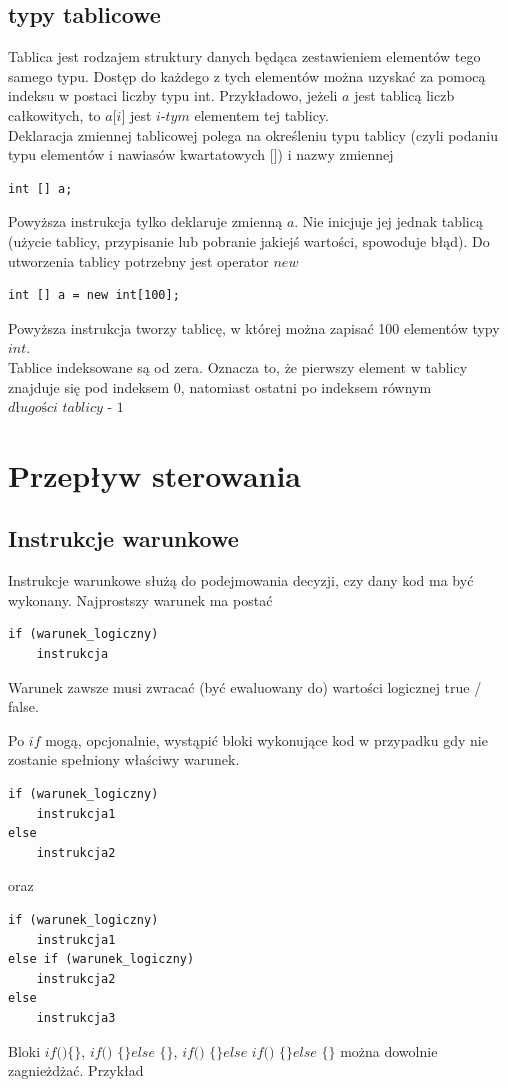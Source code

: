 \documentclass[11pt]{article}
\begin{document}
\subsection{typy tablicowe} 
Tablica jest rodzajem struktury danych będąca zestawieniem elementów tego samego typu. Dostęp do każdego z tych elementów można uzyskać za pomocą indeksu w postaci liczby typu int. Przykładowo, jeżeli $\textit{a}$ jest tablicą liczb całkowitych, to $\textit{a[i]}$ jest $\textit{i-tym}$ elementem tej tablicy.\\
Deklaracja zmiennej tablicowej polega na określeniu typu tablicy (czyli podaniu typu elementów i nawiasów kwartatowych $\textit{[]}$) i nazwy zmiennej
\begin{lstlisting}
int [] a;
\end{lstlisting}
Powyższa instrukcja tylko deklaruje zmienną $\textit{a}$. Nie inicjuje jej jednak tablicą (użycie tablicy, przypisanie lub pobranie jakiejś wartości, spowoduje błąd). Do utworzenia tablicy potrzebny jest operator $\textit{new}$
\begin{lstlisting}
int [] a = new int[100];
\end{lstlisting}
Powyższa instrukcja tworzy tablicę, w której można zapisać 100 elementów typy $\textit{int}$.\\
Tablice indeksowane są od zera. Oznacza to, że pierwszy element w tablicy znajduje się pod indeksem 0, natomiast ostatni po indeksem równym $\textit{długości tablicy - 1}$

\section{Przepływ sterowania}
\subsection{Instrukcje warunkowe}
Instrukcje warunkowe służą do podejmowania decyzji, czy dany kod ma być wykonany. Najprostszy warunek ma postać 
\begin{lstlisting}
if (warunek_logiczny) 
	instrukcja
\end{lstlisting}
Warunek zawsze musi zwracać (być ewaluowany do) wartości logicznej true / false. 

Po $\textit{if}$ mogą, opcjonalnie, wystąpić bloki wykonujące kod w przypadku gdy nie zostanie spełniony właściwy warunek.
\begin{lstlisting}
if (warunek_logiczny) 
	instrukcja1
else
	instrukcja2
\end{lstlisting}
oraz 
\begin{lstlisting}
if (warunek_logiczny) 
	instrukcja1
else if (warunek_logiczny) 
	instrukcja2
else
	instrukcja3
\end{lstlisting}
Bloki $\textit{if()\{ \}}$, $\textit{if() \{ \} else \{ \}}$, $\textit{if() \{ \} else if() \{ \} else \{ \}}$ można dowolnie zagnieżdżać. Przykład

\end{document}
